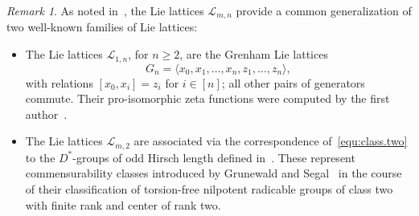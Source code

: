 \documentclass[11pt,a4paper]{amsart}
\theoremstyle{plain}
\theoremstyle{remark}
\newtheorem{rem}[thm]{Remark}
\begin{document}
\begin{rem} \label{rem:lmn.families}
As noted in~\cite{BKO/Dstar}, the Lie lattices $\mathcal{L}_{m,n}$ provide a common generalization of two well-known families of Lie lattices:
\begin{itemize}
\item The Lie lattices $\mathcal{L}_{1,n}$, for $n \geq 2$, are the Grenham Lie lattices 
$$G_n = \langle x_0, x_1, \dots, x_n, z_1, \dots, z_n \rangle,$$
with relations $[x_0, x_i] = z_i$ for $i \in [n]$; all other pairs of generators commute.  Their pro-isomorphic zeta functions were computed by the first author~\cite[\S3.3.2]{Berman/05}.
\item The Lie lattices $\mathcal{L}_{m,2}$ are associated via the correspondence of~\eqref{equ:class.two} to the $D^\ast$-groups of odd Hirsch length defined in~\cite[\S1.1]{BKO/Dstar}.  These represent commensurability classes introduced by Grunewald and Segal~\cite[\S6]{GSegal/84} in the course of their classification of torsion-free nilpotent radicable groups of class two with finite rank and center of rank two.
\end{itemize}
\end{rem}
\end{document}
